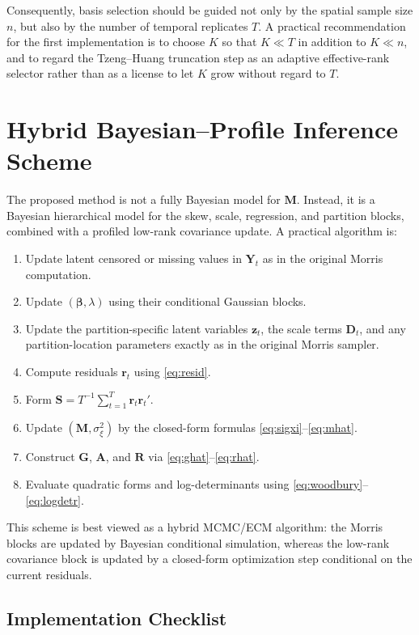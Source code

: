 \documentclass[11pt]{article}
\newcommand{\bY}{\mathbf{Y}}
\newcommand{\bD}{\mathbf{D}}
\newcommand{\bG}{\mathbf{G}}
\newcommand{\bM}{\mathbf{M}}
\newcommand{\bR}{\mathbf{R}}
\newcommand{\bA}{\mathbf{A}}
\newcommand{\bS}{\mathbf{S}}
\newcommand{\bz}{\mathbf{z}}
\newcommand{\br}{\mathbf{r}}
\begin{document}
Consequently, basis selection should be guided not only by the spatial sample
size $n$, but also by the number of temporal replicates $T$. A practical
recommendation for the first implementation is to choose $K$ so that $K \ll T$
in addition to $K \ll n$, and to regard the Tzeng--Huang truncation step as an
adaptive effective-rank selector rather than as a license to let $K$ grow
without regard to $T$.

\section{Hybrid Bayesian--Profile Inference Scheme}

The proposed method is not a fully Bayesian model for $\bM$. Instead, it is a
Bayesian hierarchical model for the skew, scale, regression, and partition
blocks, combined with a profiled low-rank covariance update. A practical
algorithm is:

\begin{enumerate}[leftmargin=2em]
\item Update latent censored or missing values in $\bY_t$ as in the original
Morris computation.
\item Update $(\bm{\beta}, \lambda)$ using their conditional Gaussian blocks.
\item Update the partition-specific latent variables $\bz_t$, the scale terms
$\bD_t$, and any partition-location parameters exactly as in the original Morris
sampler.
\item Compute residuals $\br_t$ using \eqref{eq:resid}.
\item Form $\bS = T^{-1} \sum_{t=1}^T \br_t \br_t'$.
\item Update $(\bM, \sigma_\xi^2)$ by the closed-form formulas
\eqref{eq:sigxi}--\eqref{eq:mhat}.
\item Construct $\bG$, $\bA$, and $\bR$ via \eqref{eq:ghat}--\eqref{eq:rhat}.
\item Evaluate quadratic forms and log-determinants using
\eqref{eq:woodbury}--\eqref{eq:logdetr}.
\end{enumerate}

This scheme is best viewed as a hybrid MCMC/ECM algorithm: the Morris blocks are
updated by Bayesian conditional simulation, whereas the low-rank covariance
block is updated by a closed-form optimization step conditional on the current
residuals.

\subsection{Implementation Checklist}
\end{document}
